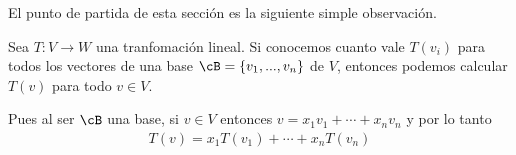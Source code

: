 \documentclass{beamer} %
\begin{document}
\begin{frame}
    
    El punto de partida de esta sección es la siguiente simple observación.\pause
    
    \begin{observacion}
        Sea $T:V\longrightarrow W$ una tranfomación lineal. Si conocemos cuanto vale $T(v_i)$ para todos los vectores de una base $\cB=\{v_1, ..., v_n\}$ de $V$, entonces podemos calcular $T(v)$ para todo $v\in V$.
    \end{observacion} \pause
    
    Pues al ser $\cB$ una base, si $v\in V$ entonces $v=x_1v_1+\cdots+ x_nv_n$ y por lo tanto
    \begin{align*}
        T(v)=x_1T(v_1)+\cdots+ x_nT(v_n) 
    \end{align*}
    
\end{frame}
\end{document}
